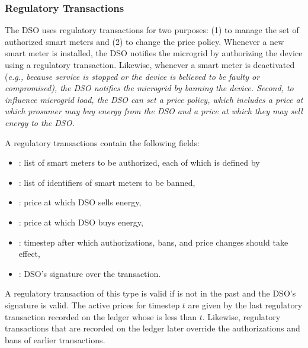 \subsubsection{Regulatory Transactions}

The DSO uses regulatory transactions for two purposes: (1) to manage
the set of authorized smart meters and (2) to change the price policy.
Whenever a new smart meter is installed, the DSO notifies the
microgrid by authorizing the device using a regulatory transaction.
Likewise, whenever a smart meter is deactivated (\em{e.g.}, because
service is stopped or the device is believed to be faulty or
compromised), the DSO notifies the microgrid by banning the device.
Second, to influence microgrid load, the DSO can set a price policy,
which includes a price at which prosumer may buy energy from the DSO
and a price at which they may sell energy to the DSO.

A regulatory transactions contain the following fields:
\begin{itemize}[noitemsep,topsep=-\parskip]
\item {}: list of smart meters to be authorized, each
  of which is defined by
\item {}: list of identifiers of smart meters to be banned, 
\item {}: price at which DSO sells energy,
\item {}: price at which DSO buys energy,
\item {}: timestep after which authorizations, bans, and price changes should take effect,
\item {}: DSO's signature over the transaction.
\end{itemize}
\vspace{\parskip}

A regulatory transaction of this type is valid if 
{} is not in the past and 
the DSO's signature is valid.
%
The active prices for timestep $t$ are given by the last regulatory
transaction recorded on the ledger whose  is less than
$t$.  Likewise, regulatory transactions that are recorded on the
ledger later override the authorizations and bans of earlier
transactions.

